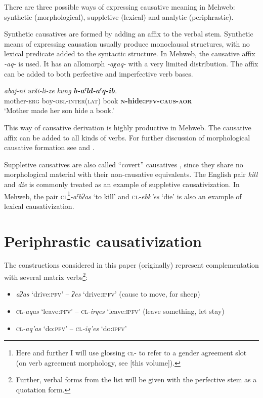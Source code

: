 ﻿\documentclass[output=paper]{langsci/langscibook}
\begin{document}
There are three possible ways of expressing causative meaning in Mehweb:
synthetic (morphological), suppletive (lexical) and analytic
(periphrastic).

Synthetic causatives are formed by adding an affix to the verbal stem.
Synthetic means of expressing causation usually produce monoclausal
structures, with no lexical predicate added to the syntactic
structure. In Mehweb, the causative affix \emph{-aq-} is used. It has an
allomorph \emph{-aχaq-} with a very limited distribution. The affix can
be added to both perfective and imperfective verb bases.

\ea %
\gll \emph{abaj-ni} \emph{urši-li-ze} \emph{kung} \emph{\textbf{b-aˤld-aˤq-ib}.} \\ 
mother-\textsc{erg} boy-\textsc{obl}-\textsc{inter}(\textsc{lat}) book \textbf{\textsc{n}-hide:\textsc{pfv}-\textsc{caus}-\textsc{aor}}\\
\glt `Mother made her son hide a book.'
\z


This way of causative derivation is highly productive in Mehweb. The
causative affix can be added to all kinds of verbs. For further
discussion of morphological causative formation see \citet{ageeva2014} and \citet{daniel2019}.

Suppletive causatives are also called ``covert'' causatives \citep{kulikov2001},
since they share no morphological material with their
non-causative equivalents. The English pair \emph{kill} and \emph{die}
is commonly treated as an example of suppletive
causativization. In Mehweb, the pair \textsc{cl}\footnote{Here and further I will
  use glossing \textsc{cl}- to refer to a gender agreement slot (on verb
  agreement morphology, see \citealt{daniel2019} [this volume]).}\emph{-aˤbʡas} `to
kill' and \textsc{cl}\emph{-ebk'es} `die' is also an example of
lexical causativization.


\section{Periphrastic causativization}\label{Periphrastic-causativization}


The constructions considered in this paper (originally) represent
complementation with several matrix verbs\footnote{Further, verbal forms
  from the list will be given with the perfective stem as a quotation
  form.}:

\begin{itemize}[topsep=\medskipamount,itemsep=0pt,partopsep=0pt,parsep=0pt]
\item
    \emph{aʔas} `drive:\textsc{pfv}' – \emph{ʔes} `drive:\textsc{ipfv}' (cause to move, for
  sheep)
\item
    \textsc{cl}\emph{-aqas} `leave:\textsc{pfv}' – \textsc{cl}\emph{-irqes}
  `leave:\textsc{ipfv}' (leave something, let stay)
\item
    \textsc{cl}\emph{-aq'as} `do:\textsc{pfv}' – \textsc{cl}\emph{-iq'es}
  `do:\textsc{ipfv}'
\end{itemize}
\end{document}
